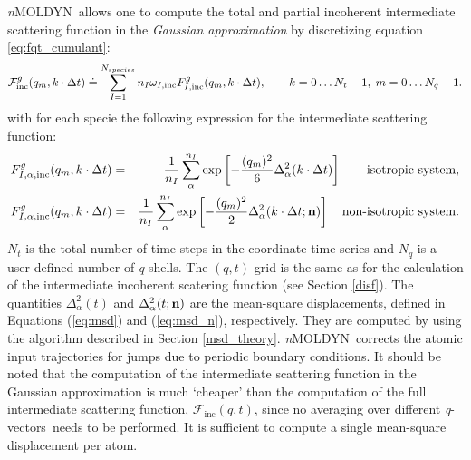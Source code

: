 \documentclass[a4paper,11pt]{report}
\newcommand{\qvects}{\textit{q}-vectors}
\newcommand{\qshells}{\textit{q}-shells}
\newcommand{\NMOLDYN}{\textit{n}MOLDYN}
\begin{document}
\NMOLDYN\ allows one to compute the total and partial incoherent intermediate scattering function in the
{\em Gaussian approximation} by discretizing equation \ref{eq:fqt_cumulant}:
\begin{equation}
{\cal F}^{g}_{\mathrm{inc}}(q_m,k\cdot\Delta t) \doteq \sum^{N_{species}}_{I = 1} n_I \omega_{I,\mathrm{inc}} F^{g}_{I, \mathrm{inc}}(q_m,k\cdot\Delta t),
\qquad k = 0\ldots N_t - 1,\; m = 0\ldots N_q - 1.
\end{equation}
with for each specie the following expression for the intermediate scattering function:
\begin{eqnarray}
F^{g}_{I,\alpha ,\mathrm{inc}}(q_m,k\cdot\Delta t) &=& \frac{1}{n_I}\sum^{n_I}_{\alpha} \exp\left[-\frac{(q_m)^2}{6}
  \Delta^2_\alpha(k\cdot\Delta t)\right]
\qquad\mbox{{\rm isotropic system}},\\
F^{g}_{I,\alpha ,\mathrm{inc}}(q_m,k\cdot\Delta t) &=& \frac{1}{n_I}\sum^{n_I}_{\alpha} \exp\left[-\frac{(q_m)^2}{2}
  \Delta^2_\alpha(k\cdot\Delta t;{\bf n})\right]
\quad\mbox{{\rm non-isotropic system}}.
\end{eqnarray}
$N_t$ is the total number of time steps in the coordinate time series and $N_q$ is a user-defined number of \qshells. 
The $(q,t)$-grid is the same as for the calculation of the intermediate incoherent scatering function (see Section \ref{disf}). 
The quantities $\Delta^2_\alpha(t)$ and $\Delta^2_\alpha(t;{\bf n})$ are the mean-square displacements, defined in 
Equations (\ref{eq:msd}) and (\ref{eq:msd_n}), respectively. They are computed by using the algorithm described in Section 
\ref{msd_theory}. \NMOLDYN\ corrects the atomic input trajectories for jumps due to periodic boundary conditions. It should 
be noted that the computation of the intermediate scattering function in the Gaussian approximation is much `cheaper' than 
the computation of the full intermediate scattering function, $\mathcal{F}_{\mathrm{inc}}(q,t)$, since no averaging over different 
\qvects\ needs to be performed. It is sufficient to compute a single mean-square displacement per atom.
\end{document}
